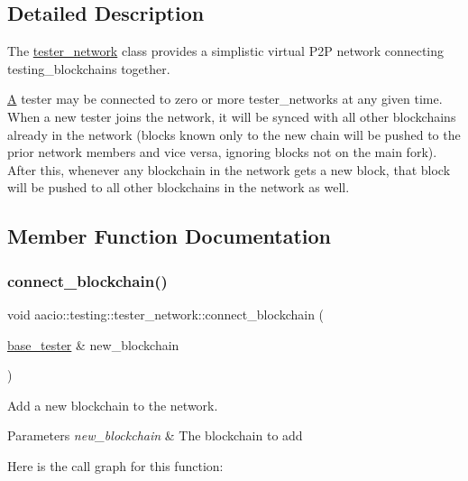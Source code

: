 \subsection{Detailed Description}
The \mbox{\hyperlink{classaacio_1_1testing_1_1tester__network}{tester\+\_\+network}} class provides a simplistic virtual P2P network connecting testing\+\_\+blockchains together. 

\mbox{\hyperlink{struct_a}{A}} tester may be connected to zero or more tester\+\_\+networks at any given time. When a new tester joins the network, it will be synced with all other blockchains already in the network (blocks known only to the new chain will be pushed to the prior network members and vice versa, ignoring blocks not on the main fork). After this, whenever any blockchain in the network gets a new block, that block will be pushed to all other blockchains in the network as well. 

\subsection{Member Function Documentation}
\mbox{\label{classaacio_1_1testing_1_1tester__network_ad830c579e32ccfd215de62ff4f45c6e5}} 
\subsubsection{\texorpdfstring{connect\+\_\+blockchain()}{connect\_blockchain()}}
{\footnotesize\ttfamily void aacio\+::testing\+::tester\+\_\+network\+::connect\+\_\+blockchain (\begin{DoxyParamCaption}\item[{\mbox{\hyperlink{classaacio_1_1testing_1_1base__tester}{base\+\_\+tester}} \&}]{new\+\_\+blockchain }\end{DoxyParamCaption})}



Add a new blockchain to the network. 


\begin{DoxyParams}{Parameters}
{\em new\+\_\+blockchain} & The blockchain to add \\
\hline
\end{DoxyParams}
Here is the call graph for this function\+:
\mbox{\label{classaacio_1_1testing_1_1tester__network_ad42cdacd71d075210517b3b76e5b982c}} 

